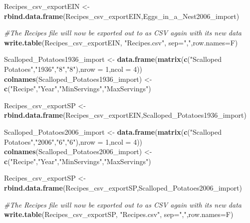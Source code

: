 \documentclass[]{article}
\newenvironment{Shaded}{\begin{snugshade}}{\end{snugshade}}
\newcommand{\KeywordTok}[1]{\textcolor[rgb]{0.13,0.29,0.53}{\textbf{#1}}}
\newcommand{\DataTypeTok}[1]{\textcolor[rgb]{0.13,0.29,0.53}{#1}}
\newcommand{\DecValTok}[1]{\textcolor[rgb]{0.00,0.00,0.81}{#1}}
\newcommand{\StringTok}[1]{\textcolor[rgb]{0.31,0.60,0.02}{#1}}
\newcommand{\CommentTok}[1]{\textcolor[rgb]{0.56,0.35,0.01}{\textit{#1}}}
\newcommand{\NormalTok}[1]{#1}
\begin{document}
\begin{Shaded}
\begin{Highlighting}[]
\NormalTok{Recipes_csv_exportEIN <-}\StringTok{ }\KeywordTok{rbind.data.frame}\NormalTok{(Recipes_csv_exportEIN,Eggs_in_a_Nest2006_import)}

\CommentTok{#The Recipes file will now be exported out to as CSV again with its new data}
\KeywordTok{write.table}\NormalTok{(Recipes_csv_exportEIN, }\StringTok{"Recipes.csv"}\NormalTok{, }\DataTypeTok{sep=}\StringTok{","}\NormalTok{,}\DataTypeTok{row.names=}\NormalTok{F)}

\NormalTok{Scalloped_Potatoes1936_import <-}\StringTok{ }\KeywordTok{data.frame}\NormalTok{(}\KeywordTok{matrix}\NormalTok{(}\KeywordTok{c}\NormalTok{(}\StringTok{"Scalloped Potatoes"}\NormalTok{,}\StringTok{"1936"}\NormalTok{,}\StringTok{"8"}\NormalTok{,}\StringTok{"8"}\NormalTok{),}\DataTypeTok{nrow =} \DecValTok{1}\NormalTok{,}\DataTypeTok{ncol =} \DecValTok{4}\NormalTok{))}
\KeywordTok{colnames}\NormalTok{(Scalloped_Potatoes1936_import) <-}\StringTok{ }\KeywordTok{c}\NormalTok{(}\StringTok{"Recipe"}\NormalTok{,}\StringTok{"Year"}\NormalTok{,}\StringTok{"MinServings"}\NormalTok{,}\StringTok{"MaxServings"}\NormalTok{)}

\NormalTok{Recipes_csv_exportSP <-}\StringTok{ }\KeywordTok{rbind.data.frame}\NormalTok{(Recipes_csv_exportEIN,Scalloped_Potatoes1936_import)}

\NormalTok{Scalloped_Potatoes2006_import <-}\StringTok{ }\KeywordTok{data.frame}\NormalTok{(}\KeywordTok{matrix}\NormalTok{(}\KeywordTok{c}\NormalTok{(}\StringTok{"Scalloped Potatoes"}\NormalTok{,}\StringTok{"2006"}\NormalTok{,}\StringTok{"6"}\NormalTok{,}\StringTok{"6"}\NormalTok{),}\DataTypeTok{nrow =} \DecValTok{1}\NormalTok{,}\DataTypeTok{ncol =} \DecValTok{4}\NormalTok{))}
\KeywordTok{colnames}\NormalTok{(Scalloped_Potatoes2006_import) <-}\StringTok{ }\KeywordTok{c}\NormalTok{(}\StringTok{"Recipe"}\NormalTok{,}\StringTok{"Year"}\NormalTok{,}\StringTok{"MinServings"}\NormalTok{,}\StringTok{"MaxServings"}\NormalTok{)}

\NormalTok{Recipes_csv_exportSP <-}\StringTok{ }\KeywordTok{rbind.data.frame}\NormalTok{(Recipes_csv_exportSP,Scalloped_Potatoes2006_import)}

\CommentTok{#The Recipes file will now be exported out to as CSV again with its new data}
\KeywordTok{write.table}\NormalTok{(Recipes_csv_exportSP, }\StringTok{"Recipes.csv"}\NormalTok{, }\DataTypeTok{sep=}\StringTok{","}\NormalTok{,}\DataTypeTok{row.names=}\NormalTok{F)}
\end{Highlighting}
\end{Shaded}
\end{document}
